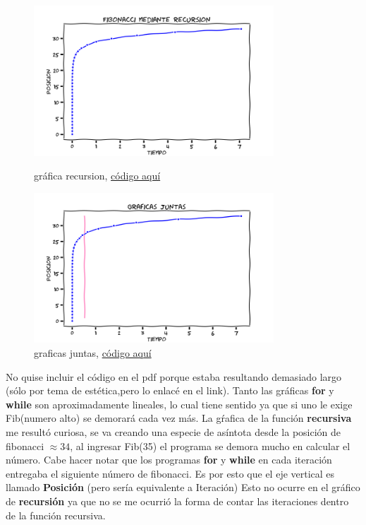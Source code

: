 \documentclass{article}
\begin{document}
\begin{figure}[H] 
\begin{minipage}[b]{0.5\linewidth} %
\centering
\includegraphics[width=9cm]{recursion.png}
\caption{gráfica recursion, \href{https://github.com/joescalona/Programacion-Astronomica/blob/master/Tarea\%205/Graficas/recursionfib.py}{ código aquí} } \label{figura1}
\end{minipage}
\hspace{0.5cm} %
\begin{minipage}[b]{0.5\linewidth}
\centering
\includegraphics[width=9cm]{todos.png}
\caption{graficas juntas, \href{https://github.com/joescalona/Programacion-Astronomica/blob/master/Tarea\%205/Graficas/juntos.py}{ código aquí}} \label{figura2}
\end{minipage}
\end{figure}

No quise incluir el código en el pdf porque estaba resultando demasiado largo (sólo por tema de estética,pero lo enlacé en el link). Tanto las gráficas \textbf{for} y  \textbf{while} son aproximadamente lineales, lo cual tiene sentido ya que si uno le exige Fib(numero alto) se demorará cada vez más. La gŕafica de la función \textbf{recursiva} me resultó curiosa, se va creando una especie de asíntota desde la posición de fibonacci $\approx 34$, al ingresar Fib(35) el programa se demora mucho en calcular el número. Cabe hacer notar que los programas \textbf{for} y \textbf{while} en cada iteración entregaba el siguiente número de fibonacci. Es por esto que el eje vertical es llamado \textbf{Posición} (pero sería equivalente a Iteración) Esto no ocurre en el gráfico de \textbf{recursión} ya que no se me ocurrió la forma de contar las iteraciones dentro de la función recursiva. 
\end{document}
